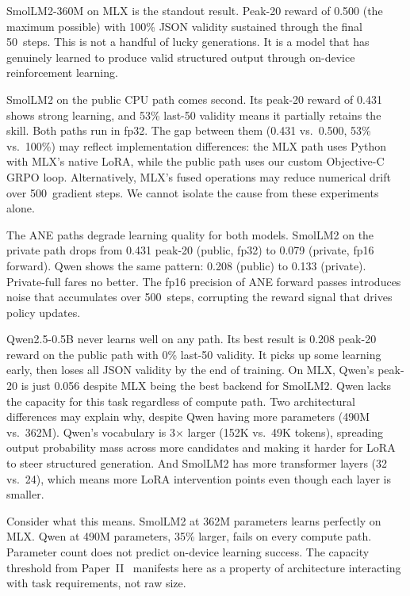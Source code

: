 \documentclass[11pt]{article}
\begin{document}
SmolLM2-360M on MLX is the standout result.  Peak-20 reward of 0.500 (the maximum possible) with 100\% JSON validity sustained through the final 50~steps.  This is not a handful of lucky generations.  It is a model that has genuinely learned to produce valid structured output through on-device reinforcement learning.

SmolLM2 on the public CPU path comes second.  Its peak-20 reward of 0.431 shows strong learning, and 53\% last-50 validity means it partially retains the skill.  Both paths run in fp32.  The gap between them (0.431 vs.\ 0.500, 53\% vs.\ 100\%) may reflect implementation differences: the MLX path uses Python with MLX's native LoRA, while the public path uses our custom Objective-C GRPO loop.  Alternatively, MLX's fused operations may reduce numerical drift over 500~gradient steps.  We cannot isolate the cause from these experiments alone.

The ANE paths degrade learning quality for both models.  SmolLM2 on the private path drops from 0.431 peak-20 (public, fp32) to 0.079 (private, fp16 forward).  Qwen shows the same pattern: 0.208 (public) to 0.133 (private).  Private-full fares no better.  The fp16 precision of ANE forward passes introduces noise that accumulates over 500~steps, corrupting the reward signal that drives policy updates.

Qwen2.5-0.5B never learns well on any path.  Its best result is 0.208 peak-20 reward on the public path with 0\% last-50 validity.  It picks up some learning early, then loses all JSON validity by the end of training.  On MLX, Qwen's peak-20 is just 0.056 despite MLX being the best backend for SmolLM2.  Qwen lacks the capacity for this task regardless of compute path.  Two architectural differences may explain why, despite Qwen having more parameters (490M vs.\ 362M).  Qwen's vocabulary is 3$\times$ larger (152K vs.\ 49K tokens), spreading output probability mass across more candidates and making it harder for LoRA to steer structured generation.  And SmolLM2 has more transformer layers (32 vs.\ 24), which means more LoRA intervention points even though each layer is smaller.

Consider what this means.  SmolLM2 at 362M parameters learns perfectly on MLX.  Qwen at 490M parameters, 35\% larger, fails on every compute path.  Parameter count does not predict on-device learning success.  The capacity threshold from Paper~II~\cite{maloney2025capacity} manifests here as a property of architecture interacting with task requirements, not raw size.
\end{document}
